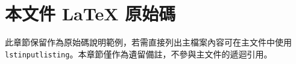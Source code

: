\section{本文件 LaTeX 原始碼}

此章節保留作為原始碼說明範例，若需直接列出主檔案內容可在主文件中使用 \texttt{lstinputlisting}。本章節僅作為遺留備註，不參與主文件的遞迴引用。
